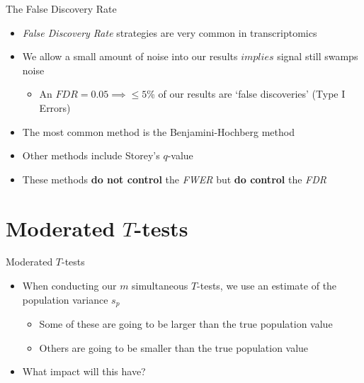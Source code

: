 \documentclass[aspectratio=169,11pt]{beamer}
\begin{document}
\begin{frame}{The False Discovery Rate}

	\begin{itemize}
		\item \textit{False Discovery Rate} strategies are very common in transcriptomics
		\item We allow a small amount of noise into our results $implies$ signal still swamps noise
		\begin{itemize}
			\item An $FDR = 0.05 \implies \leq 5$\% of our results are `false discoveries' (Type I Errors)
		\end{itemize}
		\item The most common method is the Benjamini-Hochberg method
		\item Other methods include Storey's $q$-value
		\item These methods \textbf{do not control} the \textit{FWER} but \textbf{do control} the \textit{FDR}
	\end{itemize}

\end{frame}

\section{Moderated $T$-tests}

\begin{frame}{Moderated $T$-tests}

	\begin{itemize}
		\item When conducting our $m$ simultaneous $T$-tests, we use an estimate of the population variance $s_p$\\[2mm]
		\begin{itemize}
			\item Some of these are going to be larger than the true population value
			\item Others are going to be smaller than the true population value	\\[4mm]
		\end{itemize}
		\pause
		\item What impact will this have?
	\end{itemize}

\end{frame}
\end{document}
